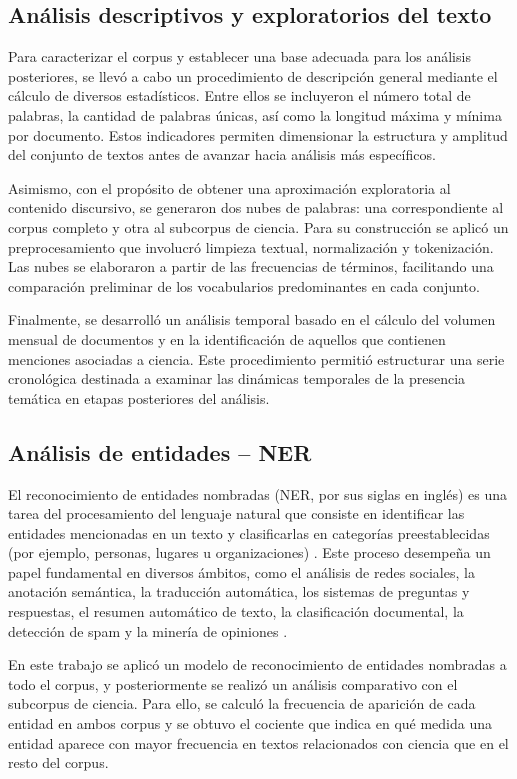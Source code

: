 \documentclass[11pt,a4paper]{article}
\begin{document}
	\subsection{Análisis descriptivos y exploratorios del texto}
	Para caracterizar el corpus y establecer una base adecuada para los análisis posteriores, se llevó a cabo un procedimiento de descripción general mediante el cálculo de diversos estadísticos. Entre ellos se incluyeron el número total de palabras, la cantidad de palabras únicas, así como la longitud máxima y mínima por documento. Estos indicadores permiten dimensionar la estructura y amplitud del conjunto de textos antes de avanzar hacia análisis más específicos.
	
	Asimismo, con el propósito de obtener una aproximación exploratoria al contenido discursivo, se generaron dos nubes de palabras: una correspondiente al corpus completo y otra al subcorpus de ciencia. Para su construcción se aplicó un preprocesamiento que involucró limpieza textual, normalización y tokenización. Las nubes se elaboraron a partir de las frecuencias de términos, facilitando una comparación preliminar de los vocabularios predominantes en cada conjunto.
	
	Finalmente, se desarrolló un análisis temporal basado en el cálculo del volumen mensual de documentos y en la identificación de aquellos que contienen menciones asociadas a ciencia. Este procedimiento permitió estructurar una serie cronológica destinada a examinar las dinámicas temporales de la presencia temática en etapas posteriores del análisis.
	
	
	
	\subsection{Análisis de entidades – NER}
	El reconocimiento de entidades nombradas (NER, por sus siglas en inglés) es una tarea del procesamiento del lenguaje natural que consiste en identificar las entidades mencionadas en un texto y clasificarlas en categorías preestablecidas (por ejemplo, personas, lugares u organizaciones) \cite{Jehangir2023}. Este proceso desempeña un papel fundamental en diversos ámbitos, como el análisis de redes sociales, la anotación semántica, la traducción automática, los sistemas de preguntas y respuestas, el resumen automático de texto, la clasificación documental, la detección de spam y la minería de opiniones \cite{Jehangir2023}.
	
	En este trabajo se aplicó un modelo de reconocimiento de entidades nombradas a todo el corpus, y posteriormente se realizó un análisis comparativo con el subcorpus de ciencia. Para ello, se calculó la frecuencia de aparición de cada entidad en ambos corpus y se obtuvo el cociente que indica en qué medida una entidad aparece con mayor frecuencia en textos relacionados con ciencia que en el resto del corpus.
	
\end{document}
